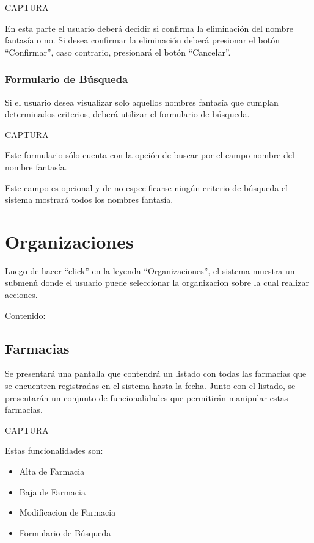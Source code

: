 \documentclass[letterpaper,10pt,spanish]{sphinxmanual}
\begin{document}
CAPTURA

En esta parte el usuario deberá decidir si confirma la eliminación del nombre fantasía o no. Si desea confirmar la eliminación deberá presionar el botón “Confirmar”, caso contrario, presionará el botón “Cancelar”.


\subsection{Formulario de Búsqueda}
\label{nombresfantasia:formulario-de-busqueda}
Si el usuario desea visualizar solo aquellos nombres fantasía que cumplan determinados criterios, deberá utilizar el formulario de búsqueda.

CAPTURA

Este formulario sólo cuenta con la opción de buscar por el campo nombre del nombre fantasía.

Este campo es opcional y de no especificarse ningún criterio de búsqueda el sistema mostrará todos los nombres fantasía.


\chapter{Organizaciones}
\label{organizaciones::doc}\label{organizaciones:organizaciones}
Luego de hacer “click” en  la leyenda ``Organizaciones'', el sistema muestra un submenú donde el usuario puede seleccionar la organizacion sobre la cual realizar acciones.

Contenido:


\section{Farmacias}
\label{farmacias:farmacias}\label{farmacias::doc}
Se presentará una pantalla que contendrá un listado con todas las farmacias que se encuentren registradas en el sistema hasta la fecha. Junto con el listado, se presentarán un conjunto de funcionalidades que permitirán manipular estas farmacias.

CAPTURA

Estas funcionalidades son:
\begin{itemize}
\item {} 
Alta de Farmacia

\item {} 
Baja de Farmacia

\item {} 
Modificacion de Farmacia

\item {} 
Formulario de Búsqueda

\end{itemize}
\end{document}
